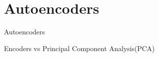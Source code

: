 \section*{Autoencoders}
\begin{frame}{Autoencoders}

\end{frame}

\begin{frame}{Encoders vs Principal Component Analysis(PCA)}

\end{frame}